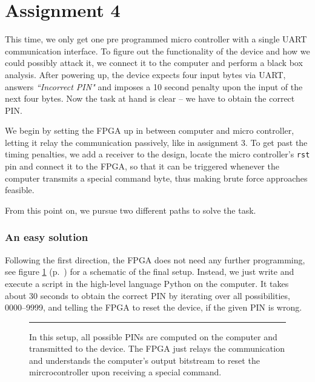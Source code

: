 \section*{Assignment 4}


This time, we only get one pre programmed micro controller with a single UART communication interface. 
To figure out the functionality of the device and how we could possibly attack it, we connect it to the computer and perform a black box analysis.
After powering up, the device expects four input bytes via UART, answers \textit{``Incorrect PIN"} and imposes a 10 second penalty upon the input of the next four bytes. Now the task at hand is clear -- we have to obtain the correct PIN.

We begin by setting the FPGA up in between computer and micro controller, letting it relay the communication passively, like in assignment 3.
To get past the timing penalties, we add a receiver to the design, locate the micro controller's \texttt{rst} pin and connect it to the FPGA, so that it can be triggered whenever the computer transmits a special command byte, thus making brute force approaches feasible.

From this point on, we pursue two different paths to solve the task.

\subsubsection*{An easy solution}
Following the first direction, the FPGA does not need any further programming, see figure \ref{fig:as4-schematic-1} (p.~\pageref{fig:as4-schematic-1}) for a schematic of the final setup. Instead, we just write and execute a script in the high-level language Python on the computer. It takes about 30 seconds to obtain the correct PIN by iterating over all possibilities, 0000--9999, and telling the FPGA to reset the device, if the given PIN is wrong.

\begin{figure}[htb]
    \begin{center}
        
        \caption{In this setup, all possible PINs are computed on the computer and transmitted to the device. The FPGA just relays the communication and understands the computer's output bitstream to reset the mircrocontroller upon receiving a special command.}
        \label{fig:as4-schematic-1}
        \vspace{1em}\hrule
    \end{center}
\end{figure}



